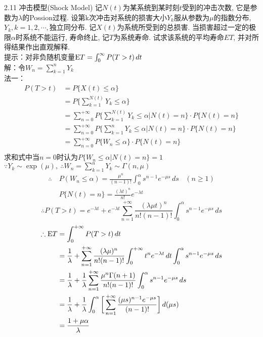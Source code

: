 2.11 冲击模型(Shock Model)   记$N(t)$为某系统到某时刻$t$受到的冲击次数, 它是参数为$\lambda$的Possion过程. 设第k次冲击对系统的损害大小$Y_k$服从参数为$\mu$的指数分布, $Y_k, k = 1, 2, \cdots, $独立同分布. 记$X(t)$为系统所受到的总损害. 当损害超过一定的极限$\alpha$时系统不能运行, 寿命终止, 记$T$为系统寿命. 试求该系统的平均寿命$ET$, 并对所得结果作出直观解释.\\
提示：对非负随机变量$\mathrm{E} T = \int^\infty_0P(T>t)\,dt$\\
解：令$W_n = \sum\limits^n_{k=1}Y_k$\\
法一：
\[
\begin{split}
P(T>t) & = P\{X(t) \leqslant \alpha\}\\
	& = P\{\sum^{N(t)}_{k=1}Y_k \leqslant \alpha\}\\
	& = \sum^{+\infty}_{n=0}P\Bigg\{\sum^{N(t)}_{k=1}Y_k \leqslant \alpha | N(t) = n\Bigg\} \cdot P\{N(t) = n\}\\
	& = \sum^{+\infty}_{n=0}P\Bigg\{\sum^n_{k=1}Y_k \leqslant \alpha | N(t) = n\Bigg\} \cdot P\{N(t) = n\}\\
	& = \sum^{+\infty}_{n=0}P\{W_n \leqslant \alpha\} \cdot P\{N(t) = n\}\\
\end{split}
\]
求和式中当$n=0$时认为$P\{W_n \leqslant \alpha | N(t) = n\} = 1$\\
$\because Y_k \sim \exp(\mu), ~\therefore W_n = \sum\limits^n_{k=1}Y_k \sim \Gamma(n,\mu)$\\
\[
\begin{split}
\therefore & ~ P(W_n \leqslant \alpha) = \frac{\mu^n}{(n-1)!}\int^\alpha_0s^{n-1}e^{-\mu s}\,ds~~~~(n\geqslant 1)\\
& ~ P\{N(t) = n\} = \frac{(\lambda t)^n}{n!}e^{-\lambda t}
\end{split}
\]
\[
\therefore P(T>t) = e^{-\lambda t} + e^{-\lambda t}\sum^{+\infty}_{n=1}\frac{(\lambda\mu t)^n}{n!(n-1)!}\int^\alpha_0s^{n-1}e^{-\mu s}\,ds
\]
\[
\begin{split}
\therefore \mathrm{E} T & = \int^{+\infty}_0P(T>t)\,dt\\
				& = \frac{1}{\lambda} + \sum^{+\infty}_{n=1}\frac{(\lambda\mu)^n}{n!(n-1)!}\int^{+\infty}_0t^ne^{-\lambda t}\,dt\int^\alpha_0s^{n-1}e^{-\mu s}\,ds\\
				& = \frac{1}{\lambda} + \frac{1}{\lambda}\sum^{+\infty}_{n=1}\frac{\mu^n\Gamma(n+1)}{n!(n-1)!}\int^\alpha_0s^{n-1}e^{-\mu s}\,ds\\
				& = \frac{1}{\lambda} + \frac{1}{\lambda}\int^\alpha_0\bigg[\sum^{+\infty}_{n=1}\frac{(\mu s)^{n-1}e^{-\mu s}}{(n-1)!}\bigg]\,d(\mu s)\\
				& = \frac{1+\mu\alpha}{\lambda}
\end{split}
\]
